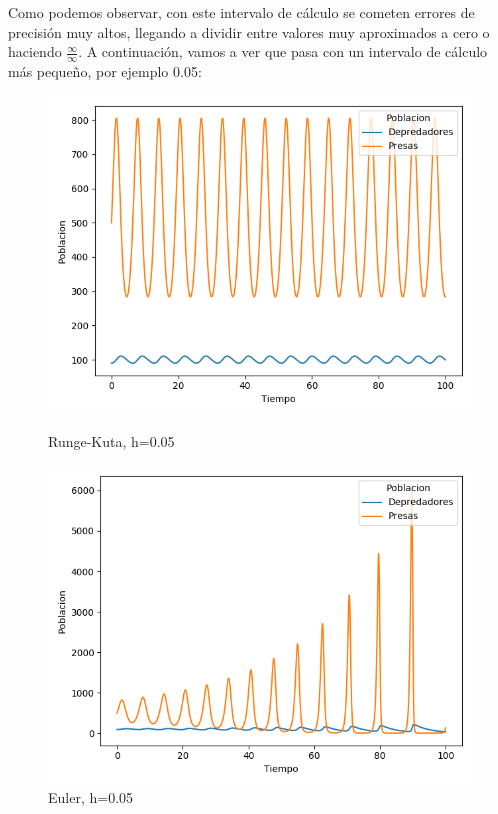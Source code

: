 \documentclass[11pt,a4paper]{article}
\begin{document}
Como podemos observar, con este intervalo de cálculo se cometen errores de precisión muy altos, llegando a dividir entre valores muy aproximados a cero
o haciendo $\frac{\infty}{\infty}$. A continuación, vamos a ver que pasa con un intervalo de cálculo más pequeño, por ejemplo 0.05:
\begin{figure}[H]
	\centering
	\begin{minipage}{0.5\textwidth}
		\centering
		\includegraphics[scale=0.4]{img/5-rk005-90-500.png}
		\caption{Runge-Kuta, h=0.05}
	\end{minipage}%
	\begin{minipage}{0.5\textwidth}
		\centering
		\includegraphics[scale=0.4]{img/5-e005-90-500.png}
		\caption{Euler, h=0.05}
	\end{minipage}
\end{figure}
\end{document}
